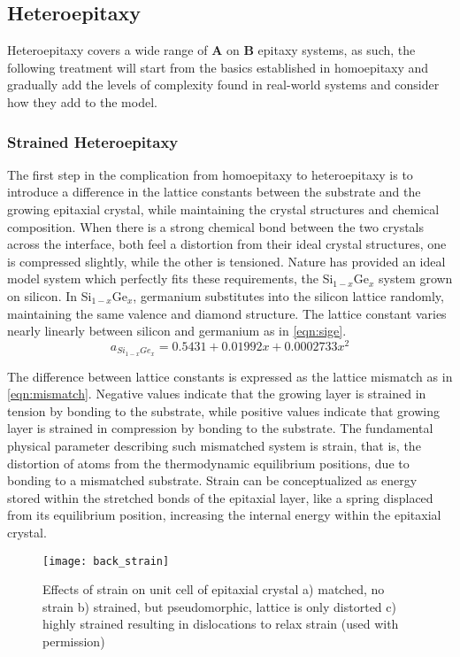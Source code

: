 \subsection{Heteroepitaxy}
Heteroepitaxy covers a wide range of \textbf{A} on \textbf{B} epitaxy systems, as such, the following treatment will start from the basics established in homoepitaxy and gradually add the levels of complexity found in real-world systems and consider how they add to the model.

\subsubsection{Strained Heteroepitaxy}
The first step in the complication from homoepitaxy to heteroepitaxy is to introduce a difference in the lattice constants between the substrate and the growing epitaxial crystal, while maintaining the crystal structures and chemical composition. When there is a strong chemical bond between the two crystals across the interface, both feel a distortion from their ideal crystal structures, one is compressed slightly, while the other is tensioned\cite{Dunstan1997}. Nature has provided an ideal model system which perfectly fits these requirements, the Si\(_{1-x}\)Ge\(_x\) system grown on silicon\cite{Paul2004}. In Si\(_{1-x}\)Ge\(_x\), germanium substitutes into the silicon lattice randomly, maintaining the same valence and diamond structure. The lattice constant varies nearly linearly between silicon and germanium as in \cref{eqn:sige}.
\begin{equation}
a_{Si_{1-x}Ge_x} = 0.5431 + 0.01992x + 0.0002733x^2 \label{eqn:sige}
\end{equation}

The difference between lattice constants is expressed as the lattice mismatch as in \cref{eqn:mismatch}. Negative values indicate that the growing layer is strained in tension by bonding to the substrate, while positive values indicate that growing layer is strained in compression by bonding to the substrate. The fundamental physical parameter describing such mismatched system is strain, that is, the distortion of atoms from the thermodynamic equilibrium positions, due to bonding to a mismatched substrate. Strain can be conceptualized as energy stored within the stretched bonds of the epitaxial layer, like a spring displaced from its equilibrium position, increasing the internal energy within the epitaxial crystal.
\begin{figure}
    \centering
    \texttt{[image: back\_strain]}
    \caption[Unit cell strain visualization]{\label{fig:back_strain}Effects of strain on unit cell of epitaxial crystal a) matched, no strain b) strained, but pseudomorphic, lattice is only distorted c) highly strained resulting in dislocations to relax strain\cite{ohring2001materials} (used with permission)}
\end{figure}


